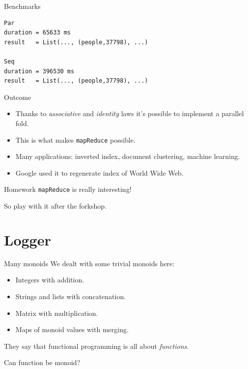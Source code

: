 \documentclass[presentation,aspectratio=169,smaller]{beamer}
\begin{document}
\begin{frame}[label={sec:org8711613},fragile]{Benchmarks}
 \begin{verbatim}
Par
duration = 65633 ms
result   = List(..., (people,37798), ...)

Seq
duration = 396530 ms
result   = List(..., (people,37798), ...)
\end{verbatim}
\end{frame}

\begin{frame}[label={sec:orge996031},fragile]{Outcome}
 \begin{itemize}
\item <1-> Thanks to \emph{associative} and \emph{identity} laws it's possible to implement a
parallel fold.
\item <2-> This is what makes \texttt{mapReduce} possible.
\item <3-> Many applications: inverted index, document clustering, machine learning.
\item <4-> Google used it to regenerate index of World Wide Web.
\end{itemize}
\end{frame}

\begin{frame}[label={sec:orgaff2d0f},fragile]{Homework}
 \texttt{mapReduce} is really interesting!

\pause

So play with it after the forkshop.
\end{frame}

\section{Logger}
\label{sec:org1baa92a}

\begin{frame}[label={sec:orgdd7bbe2}]{Many monoids}
We dealt with some trivial monoids here:

\begin{itemize}
\item Integers with addition.
\item Strings and lists with concatenation.
\item Matrix with multiplication.
\item Maps of monoid values with merging.
\end{itemize}

\pause

They say that functional programming is all about \emph{functions}.

\pause

Can function be monoid?
\end{frame}
\end{document}
